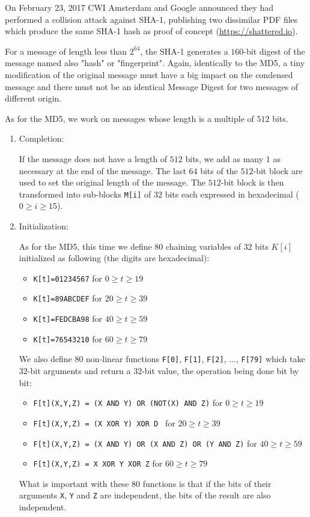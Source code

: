 	On February 23, 2017 CWI Amsterdam and Google announced they had performed a collision attack against SHA-1, publishing two dissimilar PDF files which produce the same SHA-1 hash as proof of concept (\url{https://shattered.io}).

 	For a message of length less than $2^{64}$, the SHA-1 generates a $160$-bit digest of the message named also "hash" or "fingerprint". Again, identically to the MD5, a tiny modification of the original message must have a big impact on the condensed message and there must not be an identical Message Digest for two messages of different origin.

	As for the MD5, we work on messages whose length is a multiple of $512$ bits.
	\begin{enumerate}
		\item Completion:
		
		If the message does not have a length of $512$ bits, we add as many $1$ as necessary at the end of the message. The last $64$ bits of the $512$-bit block are used to set the original length of the message. The $512$-bit block is then transformed into sub-blocks \texttt{M[i]} of $32$ bits each expressed in hexadecimal ($0\ge i\ge 15$).
		
		\item Initialization:
		
		As for the MD5, this time we define $80$ chaining variables of $32$ bits $K[i]$ initialized as following (the digits are hexadecimal):
		\begin{itemize}
			\item \texttt{K[t]=01234567} for $0\ge t\ge 19$
			\item \texttt{K[t]=89ABCDEF} for $20\ge t\ge 39$
			\item \texttt{K[t]=FEDCBA98} for $40\ge t\ge 59$
			\item \texttt{K[t]=76543210} for $60\ge t\ge 79$
		\end{itemize}
		We also define $80$ non-linear functions \texttt{F[0]}, \texttt{F[1]}, \texttt{F[2]}, ..., \texttt{F[79]} which take $32$-bit arguments and return a $32$-bit value, the operation being done bit by bit:
		\begin{itemize}
			\item \texttt{F[t](X,Y,Z) = (X AND Y) OR (NOT(X) AND Z)} for $0\ge t\ge 19$
			\item \texttt{F[t](X,Y,Z) = (X XOR Y) XOR D } for $20\ge t\ge 39$
			\item \texttt{F[t](X,Y,Z) = (X AND Y) OR (X AND Z) OR (Y AND Z)} for $40\ge t\ge 59$
			\item \texttt{F[t](X,Y,Z) = X XOR Y XOR Z} for $60\ge t\ge 79$
		\end{itemize}
		What is important with these $80$ functions is that if the bits of their arguments \texttt{X}, \texttt{Y} and \texttt{Z} are independent, the bits of the result are also independent.
	

\end{enumerate}
